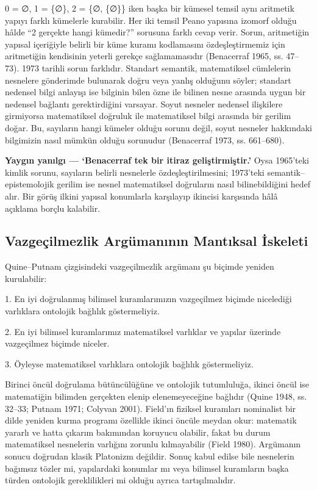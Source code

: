 0 = ∅,     1 = \{∅\},      2 = \{∅, \{∅\}\} iken başka bir kümesel temsil aynı aritmetik yapıyı farklı kümelerle kurabilir. Her iki temsil Peano yapısına izomorf olduğu hâlde “2 gerçekte hangi kümedir?” sorusuna farklı cevap verir. Sorun, aritmetiğin yapısal içeriğiyle belirli bir küme kuramı kodlamasını özdeşleştirmemiz için aritmetiğin kendisinin yeterli gerekçe sağlamamasıdır (Benacerraf 1965, ss. 47–73). 1973 tarihli sorun farklıdır. Standart semantik, matematiksel cümlelerin nesnelere gönderimde bulunarak doğru veya yanlış olduğunu söyler; standart nedensel bilgi anlayışı ise bilginin bilen özne ile bilinen nesne arasında uygun bir nedensel bağlantı gerektirdiğini varsayar. Soyut nesneler nedensel ilişkilere girmiyorsa matematiksel doğruluk ile matematiksel bilgi arasında bir gerilim doğar. Bu, sayıların hangi kümeler olduğu sorunu değil, soyut nesneler hakkındaki bilgimizin nasıl mümkün olduğu sorunudur (Benacerraf 1973, ss. 661–680).

\textbf{Yaygın yanılgı — ‘Benacerraf tek bir itiraz geliştirmiştir.’} Oysa 1965’teki kimlik sorunu, sayıların belirli nesnelerle özdeşleştirilmesini; 1973’teki semantik–epistemolojik gerilim ise nesnel matematiksel doğruların nasıl bilinebildiğini hedef alır. Bir görüş ilkini yapısal konumlarla karşılayıp ikincisi karşısında hâlâ açıklama borçlu kalabilir.

\subsection{Vazgeçilmezlik Argümanının Mantıksal İskeleti}
Quine–Putnam çizgisindeki vazgeçilmezlik argümanı şu biçimde yeniden kurulabilir:

1. En iyi doğrulanmış bilimsel kuramlarımızın vazgeçilmez biçimde nicelediği varlıklara ontolojik bağlılık göstermeliyiz.

2. En iyi bilimsel kuramlarımız matematiksel varlıklar ve yapılar üzerinde vazgeçilmez biçimde niceler.

3. Öyleyse matematiksel varlıklara ontolojik bağlılık göstermeliyiz.

Birinci öncül doğrulama bütüncülüğüne ve ontolojik tutumluluğa, ikinci öncül ise matematiğin bilimden gerçekten elenip elenemeyeceğine bağlıdır (Quine 1948, ss. 32–33; Putnam 1971; Colyvan 2001). Field’ın fiziksel kuramları nominalist bir dilde yeniden kurma programı özellikle ikinci öncüle meydan okur: matematik yararlı ve hatta çıkarım bakımından koruyucu olabilir, fakat bu durum matematiksel nesnelerin varlığını zorunlu kılmayabilir (Field 1980). Argümanın sonucu doğrudan klasik Platonizm değildir. Sonuç kabul edilse bile nesnelerin bağımsız tözler mi, yapılardaki konumlar mı veya bilimsel kuramların başka türden ontolojik gereklilikleri mi olduğu ayrıca tartışılmalıdır.

